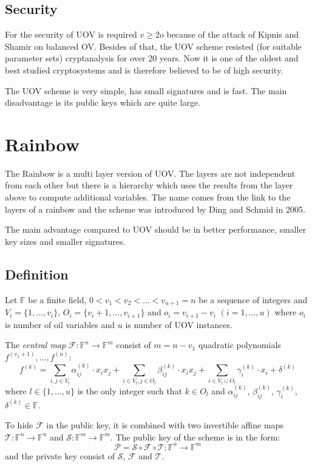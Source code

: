 \documentclass[thesis=M,english]{FITthesis}[2019/12/23]
\begin{document}
\subsection{Security}
For the security of UOV is required $v \geq 2o$ because of the attack of Kipnis and Shamir on balanced OV.\cite{L-KS98} Besides of that, the UOV scheme resisted (for suitable parameter sets) cryptanalysis for over 20 years. Now it is one of the oldest and best studied cryptosystems and is therefore believed to be of high security.

The UOV scheme is very simple, has small signatures and is fast. The main disadvantage is its public keys which are quite large.

\section{Rainbow}
The Rainbow is a multi layer version of UOV. The layers are not independent from each other but there is a hierarchy which uses the results from the layer above to compute additional variables. The name comes from the link to the layers of a rainbow and the scheme was introduced by Ding and Schmid in 2005.

The main advantage compared to UOV should be in better performance, smaller key sizes and smaller signatures.

\subsection{Definition}
Let $\mathbb{F}$ be a finite field, $0<v_1<v_2<\ldots<v_{u+1} = n$ be a sequence of integers and $V_i=\{1, \ldots, v_i\}$, $O_i=\{v_i+1, \ldots, v_{i+1}\}$ and $o_i = v_{i+1} - v_i \,\, (i=1,\ldots,u)$ where $o_i$ is number of oil variables and $u$ is number of UOV instances.

\bigskip
\noindent
The \textit{central map} $\mathcal{F}:\mathbb{F}^n \rightarrow \mathbb{F}^m$ consist of $m = n - v_1$ quadratic polynomials $f^{(v_1+1)}, \ldots, f^{(n)}$:
\[
	f^{(k)} = \sum\limits_{i,j \in V_l}{\alpha_{ij}^{(k)} \cdot x_ix_j} +  \sum\limits_{i \in V_l,j \in O_l}{\beta_{ij}^{(k)} \cdot x_ix_j}+ \sum\limits_{i \in V_l \cup O_l}{\gamma_{i}^{(k)} \cdot x_i} + \delta^{(k)}
\]
where $l \in \{1, \ldots, u\}$ is the only integer such that $k \in O_l$ and $\alpha_{ij}^{(k)}$, $\beta_{ij}^{(k)}$, $\gamma_{i}^{(k)}$, $\delta^{(k)} \in \mathbb{F}$.

\bigskip
\noindent
To hide $\mathcal{F}$ in the public key, it is combined with two invertible affine maps $\mathcal{T}: \mathbb{F}^n \rightarrow \mathbb{F}^n$ and $\mathcal{S}: \mathbb{F}^m \rightarrow \mathbb{F}^m$. The public key of the scheme is in the form:
\[
	\mathcal{P} = \mathcal{S} \circ \mathcal{F} \circ \mathcal{T} : \mathbb{F}^n \rightarrow \mathbb{F}^m
\]
and the private key consist of $\mathcal{S}$, $\mathcal{F}$ and $\mathcal{T}$.
\end{document}
